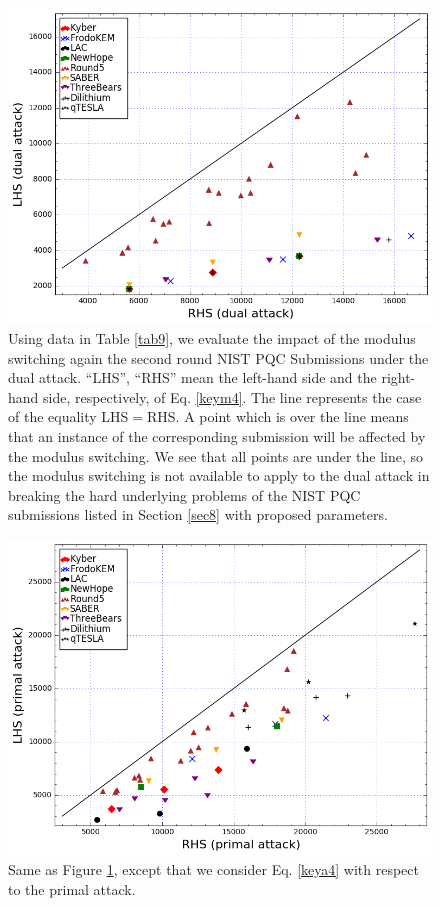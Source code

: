 \documentclass{cta-author}
\begin{document}
\begin{figure}[pt]
	\centering
	\includegraphics[scale=0.445, bb=0 0 560 430]{nist2.png}
	\caption{Using data in Table \ref{tab9}, we evaluate the impact of the modulus switching again the second round NIST PQC Submissions under the dual attack. ``LHS'', ``RHS'' mean the left-hand side and the right-hand side, respectively, of Eq. \eqref{keym4}. The line represents the case of the equality LHS$=$RHS. A point which is over the line means that an instance of the corresponding submission will be affected by the modulus switching.  We see that all points are under the line, so the modulus switching is not available to apply to the dual attack in breaking the hard underlying problems of the NIST PQC submissions listed in Section \ref{sec8} with proposed parameters.}
	\label{fig:nist2}
\end{figure}

\begin{figure}[pt]
	\centering
	\includegraphics[scale=0.445, bb=0 0 560 430]{nist1.png}
	\caption{Same as Figure \ref{fig:nist2}, except that we consider Eq. \eqref{keya4} with respect to the primal  attack. }
	\label{fig:nist1}
\end{figure}
\end{document}
